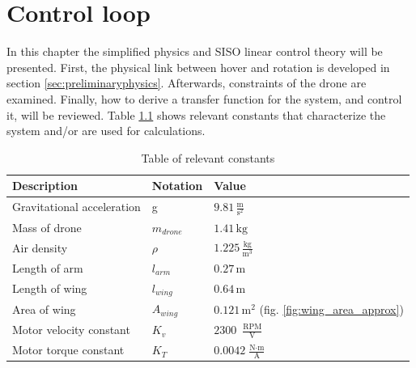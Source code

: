 \chapter{Control loop}\label{controlloopchapter}
In this chapter the simplified physics and SISO linear control theory will be presented. First, the physical link between hover and rotation is developed in section \ref{sec:preliminaryphysics}. Afterwards, constraints of the drone are examined. Finally, how to derive a transfer function for the system, and control it, will be reviewed. Table \ref{tab:constants} shows relevant constants that characterize the system and/or are used for calculations.

\begin{table}[h!]
\centering
\renewcommand{\arraystretch}{1.3}
\begin{tabular}{|l|l|l|}
\hline
Description                & Notation    & Value \\ \hline
Gravitational acceleration & g           & $9.81 \,\frac{\text{m}}{\text{s}^2}$                              \\ \hline
Mass of drone              & $m_{drone}$ & $1.41 \,\text{kg}$  \\ \hline
Air density                & $\rho$      & $1.225 \,\frac{\text{kg}}{\text{m}^3}$                             \\ \hline
Length of arm              & $l_{arm}$   & $0.27\,\text{m}$                              \\ \hline
Length of wing             & $l_{wing}$  & $0.64\,\text{m}$                              \\ \hline
Area of wing               & $A_{wing}$  & $0.121\,\text{m}^2$ (fig. \ref{fig:wing_area_approx})                             \\ \hline
Motor velocity constant    & $K_v$       & $2300$\, $\frac{\text{RPM}}{\text{V}}$       \\ \hline
Motor torque constant      & $K_T$       & $0.0042\, \frac{\text{N}\cdot\text{m}}{\text{A}}$                            \\ \hline
\end{tabular}
\caption{Table of relevant constants}
\label{tab:constants}
\end{table}

